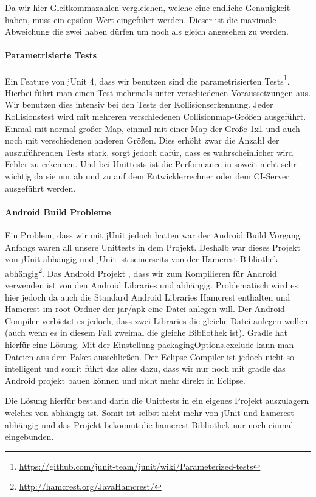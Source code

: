 Da wir hier Gleitkommazahlen vergleichen, welche eine endliche Genauigkeit haben, muss ein epsilon Wert eingeführt werden. Dieser ist die maximale Abweichung die zwei  haben dürfen um noch als gleich angesehen zu werden.

\paragraph{Parametrisierte Tests}

Ein Feature von jUnit 4, dass wir benutzen sind die parametrisierten Tests\footnote{\url{https://github.com/junit-team/junit/wiki/Parameterized-tests}}. 
Hierbei führt man einen Test mehrmals unter verschiedenen Voraussetzungen aus. 
Wir benutzen dies intensiv bei den Tests der Kollisionserkennung. 
Jeder Kollisionstest wird mit mehreren verschiedenen Collisionmap-Größen ausgeführt. 
Einmal mit normal großer Map, einmal mit einer Map der Größe 1x1 und auch noch mit verschiedenen anderen Größen. 
Dies erhöht zwar die Anzahl der auszuführenden Tests stark, sorgt jedoch dafür, dass es wahrscheinlicher wird Fehler zu erkennen. 
Und bei Unittests ist die Performance in soweit nicht sehr wichtig da sie nur ab und zu auf dem Entwicklerrechner oder dem CI-Server ausgeführt werden.

\paragraph{Android Build Probleme}

Ein Problem, dass wir mit jUnit jedoch hatten war der Android Build Vorgang. 
Anfangs waren all unsere Unittests in dem  Projekt. Deshalb war dieses Projekt von jUnit abhängig und jUnit ist seinerseits von der Hamcrest Bibliothek abhängig\footnote{\url{http://hamcrest.org/JavaHamcrest/}}. 
Das Android Projekt , dass wir zum Kompilieren für Android verwenden ist von den Android Libraries und  abhängig.
Problematisch wird es hier jedoch da auch die Standard Android Libraries Hamcrest enthalten und Hamcrest im root Ordner der jar/apk eine Datei  anlegen will. Der Android Compiler verbietet es jedoch, dass zwei Libraries die gleiche Datei anlegen wollen (auch wenn es in diesem Fall zweimal die gleiche Bibliothek ist).
Gradle hat hierfür eine Lösung. Mit der Einstellung packagingOptions.exclude kann man Dateien aus dem Paket ausschließen. Der Eclipse Compiler ist jedoch nicht so intelligent und somit führt das alles dazu, dass wir nur noch mit gradle das Android projekt bauen können und nicht mehr direkt in Eclipse.

Die Lösung hierfür bestand darin die Unittests in ein eigenes Projekt  auszulagern welches von  abhängig ist. Somit ist  selbst nicht mehr von jUnit und hamcrest abhängig und das Projekt  bekommt die hamcrest-Bibliothek nur noch einmal eingebunden.